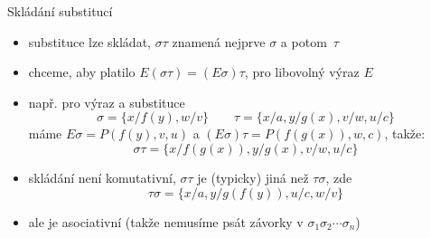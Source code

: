 \documentclass{beamer}
\begin{document}
\begin{frame}{Skládání substitucí}
    
    \begin{itemize}
        \item substituce lze \alert{skládat}, \alert{$\sigma\tau$} znamená nejprve $\sigma$ a potom~$\tau$
        \item chceme, aby platilo \alert{$E(\sigma\tau)=(E\sigma)\tau$}, pro libovolný výraz $E$
        \item např. pro výraz  a substituce
        $$
        \sigma=\{x/f(y),w/v\}\qquad\tau=\{x/a,y/g(x),v/w,u/c\}
        $$
        máme $E\sigma=P(f(y),v,u)$ a $(E\sigma)\tau=P(f(g(x)),w,c)$, takže:
        $$
        \sigma\tau=\{x/f(g(x)),y/g(x),v/w,u/c\}
        $$
        \item skládání není komutativní, $\sigma\tau$ je (typicky) jiná než $\tau\sigma$, zde
        $$
        \tau\sigma=\{x/a,y/g(f(y)),u/c,w/v\}
        $$
        \item ale je asociativní (takže nemusíme psát závorky v $\sigma_1\sigma_2\cdots\sigma_n$)
    \end{itemize}


\end{frame}
\end{document}
